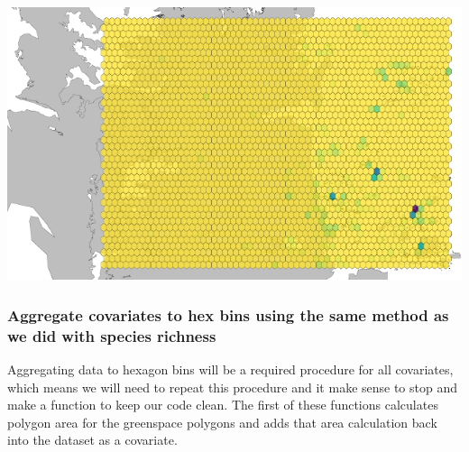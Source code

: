 \documentclass[
]{article}
\begin{document}
\includegraphics{Earth_Lab_application_files/figure-latex/unnamed-chunk-12-1.pdf}

\hypertarget{aggregate-covariates-to-hex-bins-using-the-same-method-as-we-did-with-species-richness}{%
\subsubsection{Aggregate covariates to hex bins using the same method as
we did with species
richness}\label{aggregate-covariates-to-hex-bins-using-the-same-method-as-we-did-with-species-richness}}

Aggregating data to hexagon bins will be a required procedure for all
covariates, which means we will need to repeat this procedure and it
make sense to stop and make a function to keep our code clean. The first
of these functions calculates polygon area for the greenspace polygons
and adds that area calculation back into the dataset as a covariate.
\end{document}
